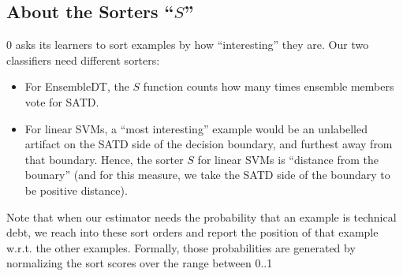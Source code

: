 \documentclass[10pt,conference]{IEEEtran}
\newcommand{\bi}{\begin{itemize}}
\newcommand{\ei}{\end{itemize}}
\begin{document}
 \subsection{About the Sorters ``$S$''}\label{sect:sorter}

{\IT}0 asks its learners to sort examples by how ``interesting'' they are.
Our two classifiers need  different sorters:
 \bi
  \item
 For EnsembleDT, the  $S$ function counts how many times ensemble members vote for SATD. 
 \item  For linear SVMs, a ``most interesting'' example would be an unlabelled artifact
 on the SATD side of the decision boundary, and furthest away from that boundary.
 Hence, the sorter $S$ for linear SVMs is ``distance from the bounary''
 (and for this measure, we take the SATD side of the boundary to be
   positive distance).

 \ei
Note that when our estimator needs the probability
that an example is  technical debt,
we reach into these sort orders and report the position of that example
w.r.t. the other examples. Formally, those
probabilities are generated by normalizing the sort scores over the
range between 0..1


\end{document}
